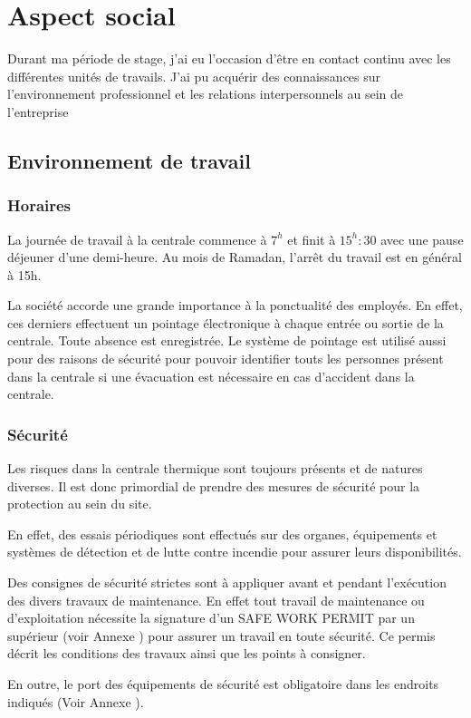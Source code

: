 \chapter{Aspect social}
Durant ma période de stage, j'ai eu l'occasion d'être en contact continu avec les différentes unités de travails. J'ai pu acquérir des connaissances sur l'environnement professionnel et les relations interpersonnels au sein de l'entreprise
\section{Environnement de travail}
\subsection{Horaires}
La journée de travail à la centrale  commence à $7^h$ et finit à $15^h:30$ avec une pause déjeuner d'une demi-heure. Au mois de Ramadan, l'arrêt du travail est en général à 15h.

La société accorde une grande importance à la ponctualité des employés. En effet, ces derniers effectuent un pointage électronique à chaque entrée ou sortie de la centrale. Toute absence est enregistrée. Le système de pointage est utilisé aussi pour des raisons de sécurité pour pouvoir identifier touts les personnes présent dans la centrale si une évacuation est nécessaire en cas d'accident dans la centrale.
\subsection{Sécurité}
Les risques dans la centrale thermique sont toujours présents et de natures diverses.
Il est donc primordial de prendre des mesures de sécurité pour la protection au sein du site.

En effet, des essais périodiques sont effectués sur  des organes, équipements et systèmes de détection et de lutte contre incendie  pour assurer leurs disponibilités.

Des consignes de sécurité strictes sont à appliquer avant et pendant l'exécution des divers travaux de maintenance. En effet tout travail de maintenance ou d'exploitation nécessite la signature d'un SAFE WORK PERMIT par un supérieur  (voir Annexe \uppercase\expandafter{}) pour assurer un travail en toute sécurité. Ce permis décrit les conditions des travaux ainsi que les points à consigner.

En outre, le port des équipements de sécurité est obligatoire dans les endroits indiqués (Voir Annexe \uppercase\expandafter{}).

